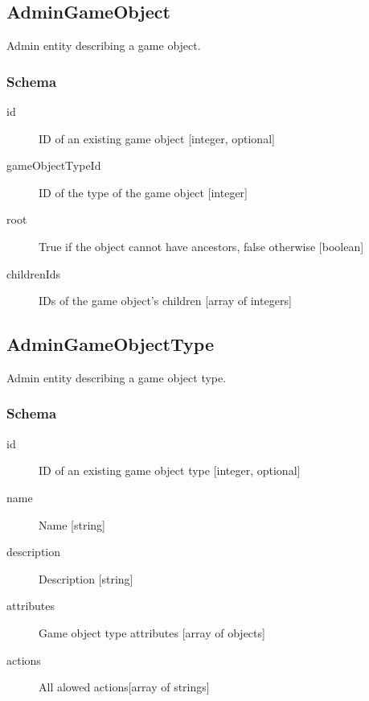 	\subsection{AdminGameObject}
		\label{json:admingameobject}
		Admin entity describing a game object.
		\subsubsection{Schema}
			\begin{description}
				\item[id] ID of an existing game object [integer, optional]
				\item[gameObjectTypeId] ID of the type of the game object [integer]
				\item[root] True if the object cannot have ancestors, false otherwise [boolean]
				\item[childrenIds] IDs of the game object's children [array of integers]
			\end{description}
			
	\subsection{AdminGameObjectType}
		\label{json:admingameobjecttype}
		Admin entity describing a game object type.
		\subsubsection{Schema}
			\begin{description}
				\item[id] ID of an existing game object type [integer, optional]
				\item[name] Name [string]
				\item[description] Description [string]
				\item[attributes] Game object type attributes [array of objects]
				\item[actions] All alowed actions[array of strings]
			\end{description}
		
	
